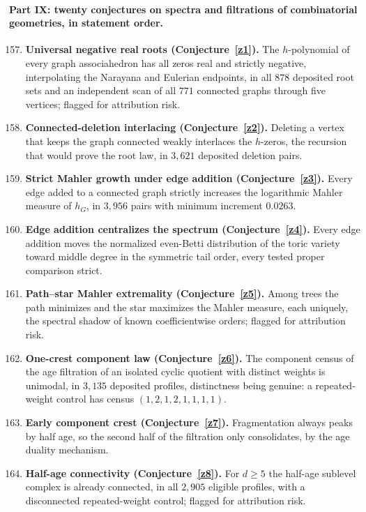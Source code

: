 \documentclass[11pt]{article}
\theoremstyle{definition}
\begin{document}
\paragraph{Part IX: twenty conjectures on spectra and filtrations of combinatorial geometries, in statement order.}
\begin{enumerate}\setcounter{enumi}{156}
\item \textbf{Universal negative real roots (Conjecture~\ref{z1}).}  The $h$-polynomial of every graph associahedron has all zeros real and strictly negative, interpolating the Narayana and Eulerian endpoints, in all $878$ deposited root sets and an independent scan of all $771$ connected graphs through five vertices; flagged for attribution risk.
\item \textbf{Connected-deletion interlacing (Conjecture~\ref{z2}).}  Deleting a vertex that keeps the graph connected weakly interlaces the $h$-zeros, the recursion that would prove the root law, in $3{,}621$ deposited deletion pairs.
\item \textbf{Strict Mahler growth under edge addition (Conjecture~\ref{z3}).}  Every edge added to a connected graph strictly increases the logarithmic Mahler measure of $h_G$, in $3{,}956$ pairs with minimum increment $0.0263$.
\item \textbf{Edge addition centralizes the spectrum (Conjecture~\ref{z4}).}  Every edge addition moves the normalized even-Betti distribution of the toric variety toward middle degree in the symmetric tail order, every tested proper comparison strict.
\item \textbf{Path--star Mahler extremality (Conjecture~\ref{z5}).}  Among trees the path minimizes and the star maximizes the Mahler measure, each uniquely, the spectral shadow of known coefficientwise orders; flagged for attribution risk.
\item \textbf{One-crest component law (Conjecture~\ref{z6}).}  The component census of the age filtration of an isolated cyclic quotient with distinct weights is unimodal, in $3{,}135$ deposited profiles, distinctness being genuine: a repeated-weight control has census $(1,2,1,2,1,1,1,1)$.
\item \textbf{Early component crest (Conjecture~\ref{z7}).}  Fragmentation always peaks by half age, so the second half of the filtration only consolidates, by the age duality mechanism.
\item \textbf{Half-age connectivity (Conjecture~\ref{z8}).}  For $d\ge5$ the half-age sublevel complex is already connected, in all $2{,}905$ eligible profiles, with a disconnected repeated-weight control; flagged for attribution risk.

\end{enumerate}
\end{document}
